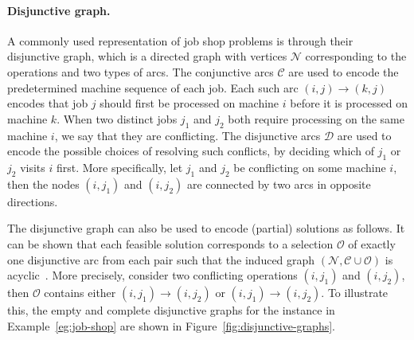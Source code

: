 \documentclass[a4paper]{report}
\theoremstyle{definition}
\theoremstyle{plain}
\begin{document}
\paragraph{Disjunctive graph.}

A commonly used representation of job shop problems is through their disjunctive
graph, which is a directed graph with vertices $\mathcal{N}$ corresponding to the
operations and two types of arcs.
%
The conjunctive arcs $\mathcal{C}$ are used to encode the predetermined machine
sequence of each job. Each such arc $(i, j) \rightarrow (k, j)$ encodes that job
$j$ should first be processed on machine $i$ before it is processed on machine
$k$.
%
When two distinct jobs $j_{1}$ and $j_{2}$ both require processing on the same
machine $i$, we say that they are conflicting.
%
The disjunctive arcs $\mathcal{D}$ are used to encode the possible choices of
resolving such conflicts, by deciding which of $j_{1}$ or $j_{2}$ visits $i$
first.
%
More specifically, let $j_{1}$ and $j_{2}$ be conflicting on some machine $i$,
then the nodes $(i,j_{1})$ and $(i,j_{2})$ are connected by two arcs in opposite
directions.

The disjunctive graph can also be used to encode (partial) solutions as follows.
%
It can be shown that each feasible solution corresponds to a selection
$\mathcal{O}$ of exactly one disjunctive arc from each pair such that the
induced graph $(\mathcal{N}, \mathcal{C} \cup \mathcal{O})$ is
acyclic~\cite{pinedoSchedulingTheoryAlgorithms2016}.
%
More precisely, consider two conflicting operations $(i,j_{1})$ and $(i,j_{2})$,
then $\mathcal{O}$ contains either $(i,j_{1}) \rightarrow (i,j_{2})$ or
$(i,j_{1}) \rightarrow (i,j_{2})$.
%
To illustrate this, the empty and complete disjunctive graphs for the instance
in Example~\ref{eg:job-shop} are shown in Figure~\ref{fig:disjunctive-graphs}.
\end{document}
